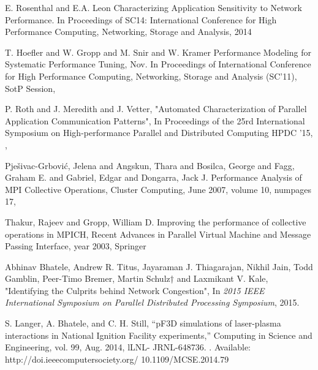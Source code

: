 \documentclass[conference]{IEEEtran}
\begin{document}
\begin{thebibliography}{10}

E. Rosenthal and E.A. Leon
\newblock Characterizing Application Sensitivity to Network Performance.
\newblock  In {Proceedings of SC14: International
Conference for High Performance Computing, Networking, Storage and Analysis},
2014

T. Hoefler and W. Gropp and M. Snir and W. Kramer
\newblock Performance Modeling for Systematic Performance Tuning,
\newblock Nov.
\newblock In {Proceedings of International Conference for High Performance Computing, Networking, Storage and Analysis (SC'11), SotP Session,
}

P. Roth and J. Meredith and J. Vetter,
\newblock "Automated Characterization of Parallel Application Communication Patterns",
In Proceedings of the 25rd International Symposium on High-performance Parallel and Distributed Computing
\newblock HPDC '15,
,


Pje\v{s}ivac-Grbovi\'{c}, Jelena and Angskun, Thara and Bosilca, George and Fagg, Graham E. and Gabriel, Edgar and Dongarra, Jack J.
\newblock Performance Analysis of MPI Collective Operations,
\newblock Cluster Computing,
\newblock June 2007,
\newblock volume 10,
\newblock numpages 17,
 

Thakur, Rajeev and Gropp, William D.
\newblock Improving the performance of collective operations in MPICH,
\newblock Recent Advances in Parallel Virtual Machine and Message Passing Interface,
\newblock year 2003,
\newblock Springer

Abhinav Bhatele, Andrew R. Titus, Jayaraman J. Thiagarajan, Nikhil Jain, Todd Gamblin,
Peer-Timo Bremer, Martin Schulz† and Laxmikant V. Kale,
\newblock "Identifying the Culprits behind Network Congestion",
\newblock In {\em 2015 IEEE International Symposium on Parallel Distributed Processing Symposium}, 2015.

S. Langer, A. Bhatele, and C. H. Still,
\newblock “pF3D simulations of laser-plasma interactions in National Ignition Facility experiments,” 
\newblock Computing in Science and Engineering, vol. 99, Aug. 2014, lLNL- JRNL-648736. 
\newblock [Online]. Available: http://doi.ieeecomputersociety.org/ 10.1109/MCSE.2014.79

%


\end{thebibliography}
\end{document}

